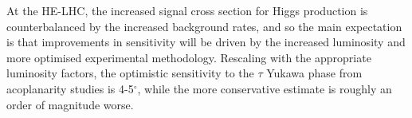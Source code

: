 \documentclass[../report.tex]{subfiles}
\begin{document}
At the HE-LHC, the increased signal cross section for Higgs production
is counterbalanced by the increased background rates, and so the main
expectation is that improvements in sensitivity will be driven by the
increased luminosity and more optimised experimental methodology.
Rescaling with the appropriate luminosity factors, the optimistic
sensitivity to the $\tau$ Yukawa phase from acoplanarity studies is
4-5$^\circ$, while the more conservative estimate is roughly an order
of magnitude worse.
\end{document}
